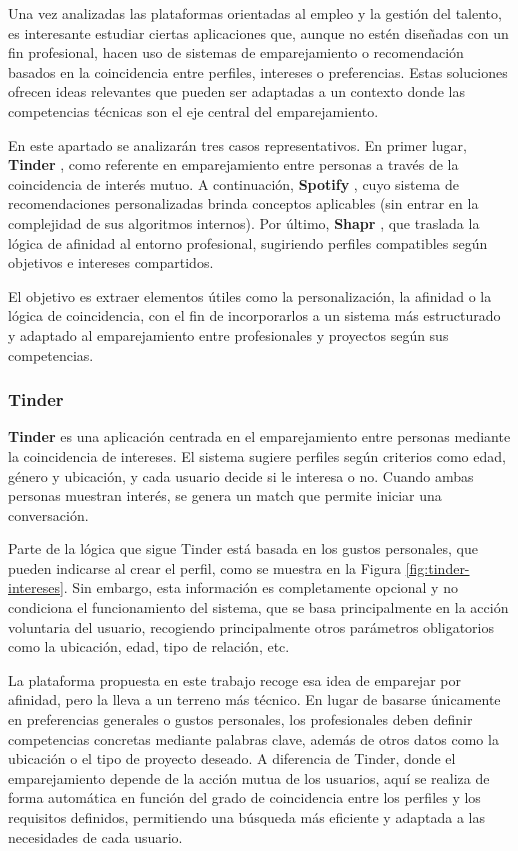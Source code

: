 Una vez analizadas las plataformas orientadas al empleo y la gestión del talento, es
interesante estudiar ciertas aplicaciones que, aunque no estén diseñadas con un fin
profesional, hacen uso de sistemas de emparejamiento o recomendación basados en la
coincidencia entre perfiles, intereses o preferencias. Estas soluciones ofrecen ideas
relevantes que pueden ser adaptadas a un contexto donde las competencias técnicas son el
eje central del emparejamiento.

En este apartado se analizarán tres casos representativos. En primer lugar, \textbf{Tinder} \cite{tinder},
como referente en emparejamiento entre personas a través de la coincidencia de interés
mutuo. A continuación, \textbf{Spotify} \cite{spotify}, cuyo sistema de recomendaciones personalizadas
brinda conceptos aplicables (sin entrar en la complejidad de sus algoritmos internos). Por
último, \textbf{Shapr} \cite{shapr}, que traslada la lógica de afinidad al entorno profesional,
sugiriendo perfiles compatibles según objetivos e intereses compartidos.

El objetivo es extraer elementos útiles como la personalización, la afinidad o la lógica
de coincidencia, con el fin de incorporarlos a un sistema más estructurado y adaptado al
emparejamiento entre profesionales y proyectos según sus competencias.

\subsubsection{Tinder}

\textbf{Tinder} \cite{tinder} es una aplicación centrada en el emparejamiento entre
personas mediante la coincidencia de intereses. El sistema sugiere perfiles según criterios
como edad, género y ubicación, y cada usuario decide si le interesa o no. Cuando ambas
personas muestran interés, se genera un \gls{match} que permite iniciar una conversación.

Parte de la lógica que sigue Tinder está basada en los gustos personales, que pueden indicarse al
crear el perfil, como se muestra en la Figura \ref{fig:tinder-intereses}. Sin embargo, esta
información es completamente opcional y no condiciona el funcionamiento del sistema, que se
basa principalmente en la acción voluntaria del usuario, recogiendo principalmente otros
parámetros obligatorios como la ubicación, edad, tipo de relación, etc.

La plataforma propuesta en este trabajo recoge esa idea de emparejar por afinidad, pero la
lleva a un terreno más técnico. En lugar de basarse únicamente en preferencias generales o
gustos personales, los profesionales deben definir competencias concretas mediante palabras
clave, además de otros datos como la ubicación o el tipo de proyecto deseado. A diferencia
de Tinder, donde el emparejamiento depende de la acción mutua de los usuarios, aquí se
realiza de forma automática en función del grado de coincidencia entre los perfiles y los
requisitos definidos, permitiendo una búsqueda más eficiente y adaptada a las necesidades de
cada usuario.

